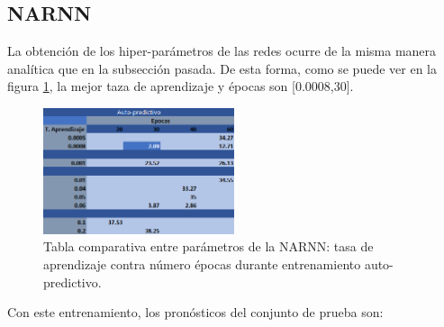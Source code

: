 \subsection{NARNN}

La obtención de los hiper-parámetros de las redes ocurre de la misma manera analítica que en la subsección pasada. De esta forma, como se puede ver en la figura \ref{fig:lr_epocas_NARNN_autopred}, la mejor taza de aprendizaje y épocas son [0.0008,30].

\begin{figure}[H]
    \centering
    \includegraphics[width=0.5\textwidth]{Figuras/proceso_de_entrenamiento/lr_epocas_NARNN_auto_pred.png}
    \caption{Tabla comparativa entre parámetros de la NARNN: tasa de aprendizaje contra número épocas durante entrenamiento auto-predictivo.} 
    \label{fig:lr_epocas_NARNN_autopred}
\end{figure}

Con este entrenamiento, los pronósticos del conjunto de prueba son:

